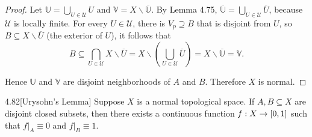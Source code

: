 \begin{proof}
	Let $\mathbb{U} = \bigcup_{U\in\mathcal{U}} U$ and $\mathbb{V} = X\smallsetminus \overline{\mathbb{U}}$. By Lemma 4.75, $\overline{\mathbb{U}} = \bigcup_{U\in \mathcal{U}} \overline{U}$, because $\mathcal{U}$ is locally finite. For every $U \in \mathcal{U}$, there is $V_{p}\supseteq B$ that is disjoint from $U$, so $B \subseteq X\smallsetminus \overline{U}$ (the exterior of $U$), it follows that
	\begin{equation*}
		B \subseteq \bigcap_{U\in\mathcal{U}} X\smallsetminus \overline{U} = X\smallsetminus \left(\bigcup_{U\in\mathcal{U}}\overline{U}\right) = X\smallsetminus \overline{\mathbb{U}} = \mathbb{V}.
	\end{equation*}

	Hence $\mathbb{U}$ and $\mathbb{V}$ are disjoint neighborhoods of $A$ and $B$. Therefore $X$ is normal.
\end{proof}

\begin{theorem}{4.82}[Urysohn's Lemma]
	Suppose $X$ is a normal topological space. If $A, B \subseteq X$ are disjoint closed subsets, then there exists a continuous function $f: X \to \left[{0, 1}\right]$ such that $f\vert_{A} \equiv 0$ and $f\vert_{B} \equiv 1$.
\end{theorem}

